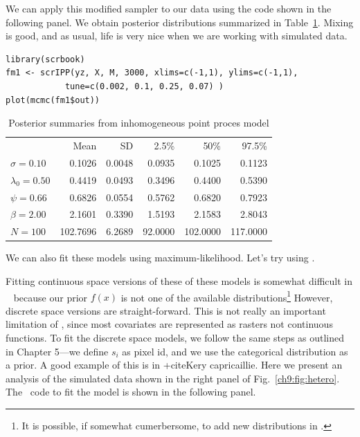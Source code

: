 We can apply this modified sampler to our data using the code shown in
the following panel. We obtain posterior
distributions summarized in Table~\ref{ch9:tab:simIPP}. Mixing is good, and as usual,
life is very nice when we are working with simulated data.

\begin{verbatim}
library(scrbook)
fm1 <- scrIPP(yz, X, M, 3000, xlims=c(-1,1), ylims=c(-1,1),
            tune=c(0.002, 0.1, 0.25, 0.07) )
plot(mcmc(fm1$out))
\end{verbatim}


\begin{table}[h]
\centering
\caption{Posterior summaries from inhomogeneous point proces model}
\begin{tabular}{lrrrrr}
\hline
& Mean & SD & 2.5\% & 50\% & 97.5\% \\
 $\sigma =0.10$ &   0.1026 &   0.0048 &   0.0935 &   0.1025 &   0.1123 \\
 $\lambda_0=0.50$ &   0.4419 &   0.0493 &   0.3496 &   0.4400 &   0.5390 \\
 $\psi =0.66$ &   0.6826 &   0.0554 &   0.5762 &   0.6820 &   0.7923 \\
 $\beta =2.00$ &   2.1601 &   0.3390 &   1.5193 &   2.1583 &   2.8043 \\
 $N =100$ & 102.7696 &   6.2689 &  92.0000 & 102.0000 & 117.0000 \\
\hline
\end{tabular}
\label{ch9:tab:simIPP}
\end{table}


We can also fit these models using maximum-likelihood. Let's try using
\secr.



Fitting continuous space versions of these of these models is somewhat
difficult in \bugs~ because our prior $f(x)$ is not one of the
available distributions\footnote{It is possible, if somewhat
  cumerbersome, to add new distributions in \bugs.} However, discrete
space versions are
straight-forward. This is not really an important limitation of \bugs,
since most covariates are represented as rasters not continuous
functions. To fit the discrete space models, we follow the same steps
as outlined in Chapter 5---we define $s_i$ as
pixel id, and we use the categorical distribution as a prior. A good
example of this is in +cite{Kery capricaillie}. Here we present
an analysis of the simulated data shown in the right panel of
Fig.~\ref{ch9:fig:hetero}. The \bugs~code to fit the model is shown in
the following panel.

